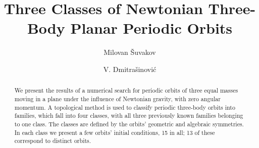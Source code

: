 \documentclass[twocolumn,showpacs,showkeys,preprintnumbers,amsmath,amssymb]{revtex4}
\begin{document}
\title{Three Classes of Newtonian Three-Body Planar Periodic Orbits} 


\author{Milovan \v Suvakov}
\author{V. Dmitra\v sinovi\' c}















\begin{abstract}
We present the results of a numerical search for periodic orbits of three
equal masses moving in a plane
under the influence of Newtonian gravity, with zero angular momentum. A
topological method is used to
classify periodic three-body orbits into families, which fall into four
classes, with all three previously
known families belonging to one class. The classes are defined by the
orbits’ geometric and algebraic
symmetries. In each class we present a few orbits’ initial conditions, 15 in
all; 13 of these correspond to
distinct orbits.

\end{abstract}
\end{document}
